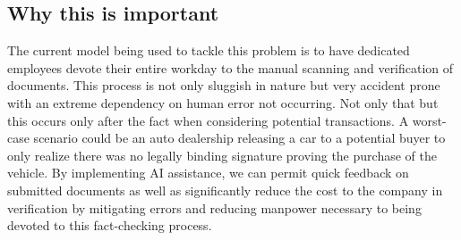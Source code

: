 \documentclass[article, onecolumn, draftclsnofoot,10pt, compsoc]{IEEEtran}
\begin{document}
\subsection{Why this is important}
The current model being used to tackle this problem is to have dedicated employees devote their entire workday to the manual scanning and verification of documents. This process is not only sluggish in nature but very accident prone with an extreme dependency on human error not occurring. Not only that but this occurs only after the fact when considering potential transactions. A worst-case scenario could be an auto dealership releasing a car to a potential buyer to only realize there was no legally binding signature proving the purchase of the vehicle. By implementing AI assistance, we can permit quick feedback on submitted documents as well as significantly reduce the cost to the company in verification by mitigating errors and reducing manpower necessary to being devoted to this fact-checking process.
\end{document}
